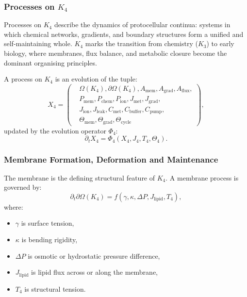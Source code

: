 

\subsubsection{Processes on \texorpdfstring{$K_4$}{K_4}}
\label{sec:processes-k4}

Processes on $K_4$ describe the dynamics of protocellular continua:
systems in which chemical networks, gradients, and boundary structures
form a unified and self-maintaining whole. $K_4$ marks the transition
from chemistry ($K_3$) to early biology, where membranes, flux balance,
and metabolic closure become the dominant organising principles.

A process on $K_4$ is an evolution of the tuple:
\[
X_4 =
\left(
\begin{aligned}
&\Omega(K_4), \partial\Omega(K_4), A_\text{mem}, A_\text{grad}, A_\text{flux},\\
&P_\text{mem}, P_\text{chem}, P_\text{ion}, J_\text{met}, J_\text{grad},\\
&J_\text{ion}, J_\text{leak}, C_\text{met}, C_\text{buffer}, C_\text{pump},\\
&\Theta_\text{mem}, \Theta_\text{grad}, \Theta_\text{cycle}
\end{aligned}
\right),
\]
updated by the evolution operator $\Phi_4$:
\[
\partial_t X_4 = \Phi_4(X_4, J_4, T_4, \Theta_4).
\]

\subsubsection{Membrane Formation, Deformation and Maintenance}

The membrane is the defining structural feature of $K_4$. A membrane
process is governed by:
\[
\partial_t \partial\Omega(K_4)
    = f(\gamma, \kappa, \Delta P, J_{\text{lipid}}, T_4),
\]
where:
\begin{itemize}
    \item $\gamma$ is surface tension,
    \item $\kappa$ is bending rigidity,
    \item $\Delta P$ is osmotic or hydrostatic pressure difference,
    \item $J_{\text{lipid}}$ is lipid flux across or along the membrane,
    \item $T_4$ is structural tension.
\end{itemize}

